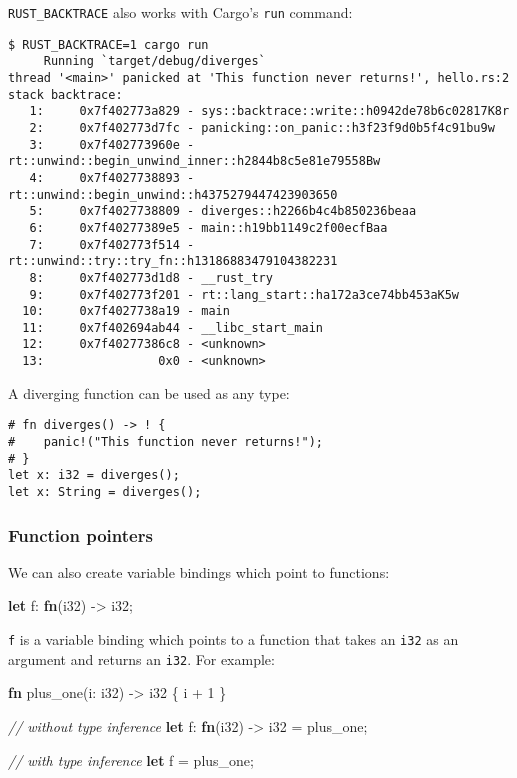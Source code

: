 \documentclass[a4paper,]{book}
\newenvironment{Shaded}{\begin{snugshade}}{\end{snugshade}}
\newcommand{\KeywordTok}[1]{\textcolor[rgb]{0.13,0.29,0.53}{\textbf{{#1}}}}
\newcommand{\DataTypeTok}[1]{\textcolor[rgb]{0.13,0.29,0.53}{{#1}}}
\newcommand{\DecValTok}[1]{\textcolor[rgb]{0.00,0.00,0.81}{{#1}}}
\newcommand{\CommentTok}[1]{\textcolor[rgb]{0.56,0.35,0.01}{\textit{{#1}}}}
\newcommand{\NormalTok}[1]{{#1}}
\begin{document}
\texttt{RUST\_BACKTRACE} also works with Cargo's \texttt{run} command:

\begin{verbatim}
$ RUST_BACKTRACE=1 cargo run
     Running `target/debug/diverges`
thread '<main>' panicked at 'This function never returns!', hello.rs:2
stack backtrace:
   1:     0x7f402773a829 - sys::backtrace::write::h0942de78b6c02817K8r
   2:     0x7f402773d7fc - panicking::on_panic::h3f23f9d0b5f4c91bu9w
   3:     0x7f402773960e - rt::unwind::begin_unwind_inner::h2844b8c5e81e79558Bw
   4:     0x7f4027738893 - rt::unwind::begin_unwind::h4375279447423903650
   5:     0x7f4027738809 - diverges::h2266b4c4b850236beaa
   6:     0x7f40277389e5 - main::h19bb1149c2f00ecfBaa
   7:     0x7f402773f514 - rt::unwind::try::try_fn::h13186883479104382231
   8:     0x7f402773d1d8 - __rust_try
   9:     0x7f402773f201 - rt::lang_start::ha172a3ce74bb453aK5w
  10:     0x7f4027738a19 - main
  11:     0x7f402694ab44 - __libc_start_main
  12:     0x7f40277386c8 - <unknown>
  13:                0x0 - <unknown>
\end{verbatim}

A diverging function can be used as any type:

\begin{verbatim}
# fn diverges() -> ! {
#    panic!("This function never returns!");
# }
let x: i32 = diverges();
let x: String = diverges();
\end{verbatim}

\subsubsection{Function pointers}\label{function-pointers}

We can also create variable bindings which point to functions:

\begin{Shaded}
\begin{Highlighting}[]
\KeywordTok{let} \NormalTok{f: }\KeywordTok{fn}\NormalTok{(}\DataTypeTok{i32}\NormalTok{) -> }\DataTypeTok{i32}\NormalTok{;}
\end{Highlighting}
\end{Shaded}

\texttt{f} is a variable binding which points to a function that takes
an \texttt{i32} as an argument and returns an \texttt{i32}. For example:

\begin{Shaded}
\begin{Highlighting}[]
\KeywordTok{fn} \NormalTok{plus_one(i: }\DataTypeTok{i32}\NormalTok{) -> }\DataTypeTok{i32} \NormalTok{\{}
    \NormalTok{i + }\DecValTok{1}
\NormalTok{\}}

\CommentTok{// without type inference}
\KeywordTok{let} \NormalTok{f: }\KeywordTok{fn}\NormalTok{(}\DataTypeTok{i32}\NormalTok{) -> }\DataTypeTok{i32} \NormalTok{= plus_one;}

\CommentTok{// with type inference}
\KeywordTok{let} \NormalTok{f = plus_one;}
\end{Highlighting}
\end{Shaded}
\end{document}
